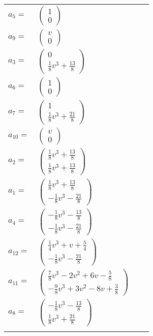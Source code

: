 \documentclass[1p]{elsarticle_modified}
\theoremstyle{definition}
\begin{document}
\begin{tabular}{m{7pt} m{180pt} m{7pt} m{180pt} }
\flushright $a_{5}=$&$\begin{pmatrix}1\\0\end{pmatrix}$ \\
\flushright $a_{9}=$&$\begin{pmatrix}v\\0\end{pmatrix}$ \\
\flushright $a_{3}=$&$\begin{pmatrix}0\\\frac{1}{8} v^3+\frac{13}{8}\end{pmatrix}$ \\
\flushright $a_{6}=$&$\begin{pmatrix}1\\0\end{pmatrix}$ \\
\flushright $a_{7}=$&$\begin{pmatrix}1\\\frac{1}{8} v^3+\frac{21}{8}\end{pmatrix}$ \\
\flushright $a_{10}=$&$\begin{pmatrix}v\\0\end{pmatrix}$ \\
\flushright $a_{2}=$&$\begin{pmatrix}\frac{1}{8} v^3+\frac{13}{8}\\\frac{1}{8} v^3+\frac{13}{8}\end{pmatrix}$ \\
\flushright $a_{1}=$&$\begin{pmatrix}\frac{1}{8} v^3+\frac{13}{8}\\-\frac{1}{8} v^3-\frac{21}{8}\end{pmatrix}$ \\
\flushright $a_{4}=$&$\begin{pmatrix}-\frac{1}{8} v^3-\frac{13}{8}\\-\frac{1}{8} v^3-\frac{21}{8}\end{pmatrix}$ \\
\flushright $a_{12}=$&$\begin{pmatrix}\frac{1}{4} v^3+v+\frac{5}{4}\\-\frac{1}{8} v^3-\frac{21}{8}\end{pmatrix}$ \\
\flushright $a_{11}=$&$\begin{pmatrix}\frac{7}{8} v^3-2 v^2+6 v-\frac{5}{8}\\-\frac{9}{8} v^3+3 v^2-8 v+\frac{3}{8}\end{pmatrix}$ \\
\flushright $a_{8}=$&$\begin{pmatrix}-\frac{1}{8} v^3-\frac{13}{8}\\\frac{1}{8} v^3+\frac{21}{8}\end{pmatrix}$\\&\end{tabular}
\end{document}
